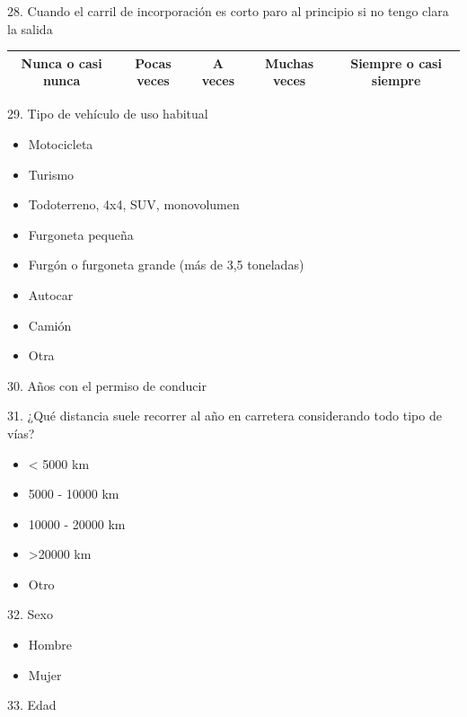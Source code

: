 28. Cuando el carril de incorporación es corto paro al principio si no tengo clara la salida
\vspace{-10pt}
\begin{table}[h]
\centering
\begin{tabular}{|c|c|c|c|c|}
\hline
Nunca o casi nunca & Pocas veces & A veces & Muchas veces & Siempre o casi siempre \\ \hline
\end{tabular}
\end{table}

29. Tipo de vehículo de uso habitual
   \begin{itemize}
        \item Motocicleta
        \item Turismo
        \item Todoterreno, 4x4, SUV, monovolumen
        \item Furgoneta pequeña
        \item Furgón o furgoneta grande (más de 3,5 toneladas)
        \item Autocar
        \item Camión
        \item Otra
   \end{itemize}
   \vspace{10pt}
   
30. Años con el permiso de conducir
   \vspace{10pt}
   
31. ¿Qué distancia suele recorrer al año en carretera considerando todo tipo de vías? 
   \begin{itemize}
        \item < 5000 km
        \item 5000 - 10000 km
        \item 10000 - 20000 km
        \item >20000 km
        \item Otro
   \end{itemize}
\vspace{10pt}
   
32. Sexo
   \begin{itemize}
        \item Hombre
        \item Mujer
   \end{itemize}
\vspace{10pt}
   
33. Edad
   \vspace{10pt}

